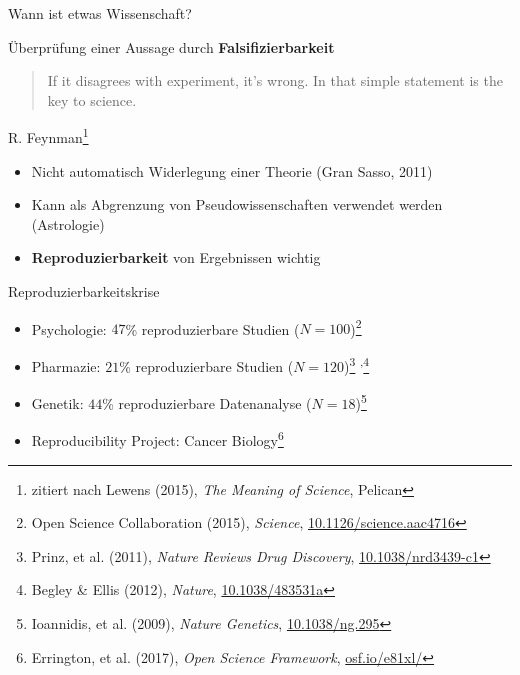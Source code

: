 \documentclass{beamer}
\begin{document}
\begin{frame}{Wann ist etwas Wissenschaft?}

    Überprüfung einer Aussage durch \textbf{Falsifizierbarkeit}
    \begin{quote}
        If it disagrees with experiment, it's wrong. In that simple statement is
        the key to science.
    \end{quote}

    {\ft\hfill R. Feynman\footnote{%
    zitiert nach Lewens (2015), \emph{The Meaning of Science},
    Pelican}\hspace{1cm}}

    \vspace{1cm}

    \begin{itemize}
        \item Nicht automatisch Widerlegung einer Theorie (Gran Sasso, 2011)
        \item Kann als Abgrenzung von Pseudowissenschaften verwendet werden
            (Astrologie)
        \item \textbf{Reproduzierbarkeit} von Ergebnissen wichtig
    \end{itemize}

\end{frame}

\begin{frame}{Reproduzierbarkeitskrise}

    \begin{itemize}
        \item Psychologie: $47$\% reproduzierbare Studien ($N=100$)\footnote{%
            Open Science Collaboration (2015), \emph{Science},
            \href{https://doi.org/10.1126/science.aac4716}{10.1126/science.aac4716}}
        \item Pharmazie: $21$\% reproduzierbare Studien ($N=120$)\footnote{%
            Prinz, et al. (2011), \emph{Nature Reviews Drug Discovery},
            \href{https://doi.org/10.1038/nrd3439-c1}{10.1038/nrd3439-c1}}%
            \textsuperscript{,}\footnote{%
            Begley \& Ellis (2012), \emph{Nature},
            \href{https://doi.org/10.1038/483531a}{10.1038/483531a}}
        \item Genetik: $44$\% reproduzierbare Datenanalyse ($N=18$)\footnote{%
            Ioannidis, et al. (2009), \emph{Nature Genetics},
            \href{https://doi.org/10.1038/ng.295}{10.1038/ng.295}}
    \end{itemize}

    \begin{itemize}
        \item Reproducibility Project: Cancer Biology\footnote{%
            Errington, et al. (2017), \emph{Open Science Framework},
            \href{https://osf.io/e81xl/}{osf.io/e81xl/}}
    \end{itemize}

\end{frame}
\end{document}
